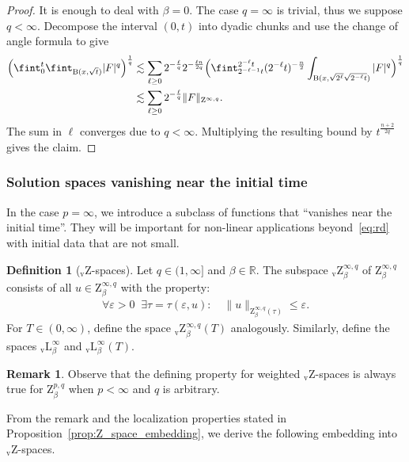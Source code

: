 \documentclass[11pt, leqno]{amsart}
\theoremstyle{definition}
\newtheorem{definition}[theorem]{Definition}
\newtheorem{remark}[theorem]{Remark}
\newcommand{\R}{\mathbb{R}}
\newcommand{\Z}{\mathrm{Z}}
\newcommand{\Zv}{{}_\mathrm{v}\mathrm{Z}}
\newcommand{\Lv}{{}_\mathrm{v}\mathrm{L}}
\newcommand{\eps}{\varepsilon}
\newcommand{\B}{\mathrm{B}}
\begin{document}
	\begin{proof}
		It is enough to deal with $\beta=0$.
		The case $q = \infty$ is trivial, thus we suppose $q < \infty$.
		Decompose the interval $(0,t)$ into dyadic chunks and use the change of angle formula to give
		\begin{align}
			\Bigl( \fint_0^t \fint_{\B(x,\sqrt{t})} |F|^q \Bigr)^\frac{1}{q} &\lesssim \sum_{\ell \geq 0} 2^{-\frac{\ell}{q}} 2^{-\frac{\ell n}{2q}} \Bigl( \fint_{2^{-\ell-1}t}^{2^{-\ell}t} (2^{-\ell} t)^{-\frac{n}{2}} \int_{\B(x,\sqrt{2^\ell} \sqrt{2^{-\ell} t})} |F|^q \Bigr)^\frac{1}{q} \\
			&\lesssim \sum_{\ell \geq 0} 2^{-\frac{\ell}{q}} \| F \|_{\Z^{\infty,q}}.
		\end{align}
		The sum in $\ell$ converges due to $q < \infty$. Multiplying the resulting bound by $t^\frac{n+2}{2q}$ gives the claim.
	\end{proof}

	\subsubsection*{Solution spaces vanishing near the initial time}

	In the case $p = \infty$, we introduce a subclass of functions that \enquote{vanishes near the initial time}. They will be important for non-linear applications beyond~\eqref{eq:rd} with initial data that are not small.

	\begin{definition}[$\Zv$-spaces]
		\label{def:Zv-spaces}
		Let $q\in (1,\infty]$ and $\beta \in \R$. The subspace $\Zv^{\infty,q}_\beta$ of $\Z^{\infty,q}_\beta$ consists of all $u \in \Z^{\infty,q}_\beta$ with the property:
		\begin{align}
			\label{eq:Zv_defining_property}
			\forall \eps > 0 \;\; \exists \tau = \tau(\eps,u) \colon \quad \| u \|_{\Z^{\infty,q}_\beta(\tau)} \leq \eps.
		\end{align}
		For $T \in (0,\infty)$, define the space $\Zv^{\infty,q}_\beta(T)$ analogously. Similarly, define the spaces $\Lv^\infty_\beta$ and $\Lv^\infty_\beta(T)$.
	\end{definition}

	\begin{remark}
		\label{rem:Zv}
		Observe that the defining property for weighted $\Zv$-spaces is always true for $\Z^{p,q}_\beta$ when $p < \infty$ and $q$ is arbitrary.
	\end{remark}

	From {the remark and} the localization properties stated in Proposition~\ref{prop:Z_space_embedding}, we derive the following embedding into $\Zv$-spaces.
\end{document}

